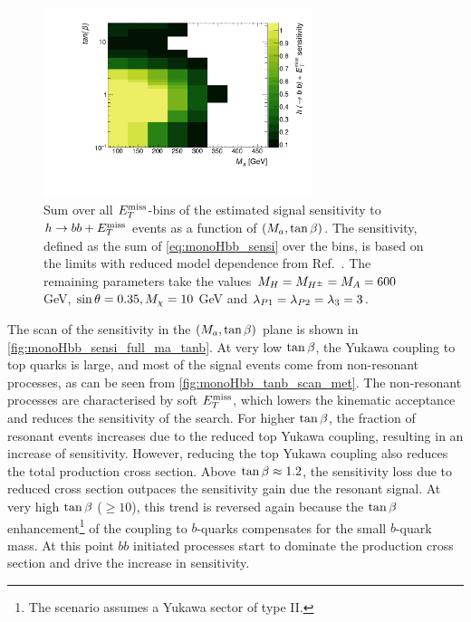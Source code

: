 \begin{figure}[tbp]
\centering
\includegraphics[width=0.7\textwidth]{texinputs/04_grid/figures/monoHbb_sensi_sum_bins_1_2_3_4_ma_vs_tanb_lin.pdf}
\caption[Sensitivity to $h\to bb + \MET$ signals in $\mA$ - $\tanb$ plane, summed across $\MET$ bins]
{
Sum over all $\MET$-bins of the estimated signal sensitivity to $h\to bb + \MET$ events as a function of $(M_{a},\tan\beta)$. 
The sensitivity, defined as the sum of \autoref{eq:monoHbb_sensi} over the \met bins, is based on the limits with reduced model dependence from Ref.~\cite{Aaboud:2017yqz}. 
The remaining parameters take the values $ M_{H}=M_{H^{\pm}}=M_{A} = 600$ GeV, $ \sin\theta = 0.35, M_{\chi} = 10$ GeV and $ \lambda_{P1} = \lambda_{P2} = \lambda_{3} = 3 $.}
\label{fig:monoHbb_sensi_full_ma_tanb}
\end{figure}

The scan of the sensitivity in the  $(M_{a},\tan\beta)$ plane is shown in  \autoref{fig:monoHbb_sensi_full_ma_tanb}. 
At very low $\tanb$, the Yukawa coupling to top quarks is large, and most of the signal events come from non-resonant processes, as can be seen from \autoref{fig:monoHbb_tanb_scan_met}. %
The non-resonant processes are characterised by soft $\MET$, which lowers the kinematic acceptance and reduces the sensitivity of the search.
For higher $\tanb$, the fraction of resonant events increases due to the reduced top Yukawa coupling, resulting in an increase of sensitivity.
However, reducing the top Yukawa coupling also reduces the total production cross section. 
Above $\tan\beta \approx 1.2$, the sensitivity loss due to reduced cross section outpaces the sensitivity gain due the resonant signal.
At very high $\tanb$ ($\geq 10$), this trend is reversed again because the $\tanb$ enhancement\footnote{The \hdma scenario assumes a Yukawa sector of type II.} of the coupling to $b$-quarks compensates for the small $b$-quark mass.
At this point $bb$ initiated processes start to dominate the production cross section and drive the increase in sensitivity.


